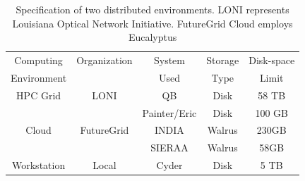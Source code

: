 \documentclass{cpeauth}
\begin{document}


\begin{table}
\small
\begin{tabular}{|c|c|c|c|c|} 
\hline 
Computing & Organization & System &  Storage & Disk-space  \\
Environment & & Used & Type  &  Limit \\ \hline
HPC Grid & LONI & QB & Disk & 58 TB   \\
 &  &  Painter/Eric  & Disk &  100 GB  \\
Cloud & FutureGrid & INDIA & Walrus & 230GB \\
         &                    &  SIERAA & Walrus & 58GB \\ 
Workstation &  Local   &  Cyder & Disk       & 5 TB\\

 \hline


 \end{tabular}
\caption{Specification of two distributed environments. LONI represents Louisiana Optical Network Initiative\cite{loni}. FutureGrid Cloud\cite{futuregrid} employs Eucalyptus}
\label{table:two-systems} 
\end{table}


\end{document}
